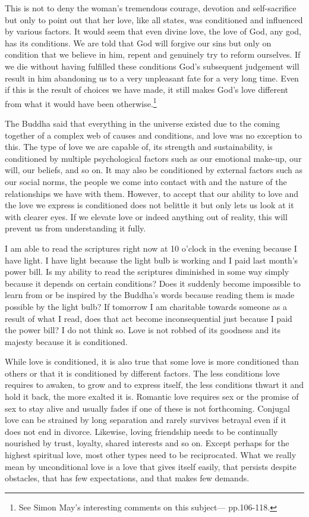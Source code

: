 \documentclass[10pt, openright]{book}
\begin{document}
This is not to deny the woman’s tremendous courage, devotion and self-sacrifice but only to point out that her love, like all states, was conditioned and influenced by various factors. It would seem that even divine love, the love of God, any god, has its conditions. We are told that God will forgive our sins but only on condition that we believe in him, repent and genuinely try to reform ourselves. If we die without having fulfilled these conditions God’s subsequent judgement will result in him abandoning us to a very unpleasant fate for a very long time. Even if this is the result of choices we have made, it still makes God’s love different from what it would have been otherwise.\footnote {See Simon May’s interesting comments on this subject—\cite{May 2012} pp.106-118.}


The Buddha said that everything in the universe existed due to the coming together of a complex web of causes and conditions, and love was no exception to this. The type of love we are capable of, its strength and sustainability, is conditioned by multiple psychological factors such as our emotional make-up, our will, our beliefs, and so on. It may also be conditioned by external factors such as our social norms, the people we come into contact with and the nature of the relationships we have with them. However, to accept that our ability to love and the love we express is conditioned does not belittle it but only lets us look at it with clearer eyes. If we elevate love or indeed anything out of reality, this will prevent us from understanding it fully.


I am able to read the scriptures right now at 10 o’clock in the evening because I have light. I have light because the light bulb is working and I paid last month’s power bill. Is my ability to read the scriptures diminished in some way simply because it depends on certain conditions? Does it suddenly become impossible to learn from or be inspired by the Buddha’s words because reading them is made possible by the light bulb? If tomorrow I am charitable towards someone as a result of what I read, does that act become inconsequential just because I paid the power bill? I do not think so. Love is not robbed of its goodness and its majesty because it is conditioned.


While love is conditioned, it is also true that some love is more conditioned than others or that it is conditioned by different factors. The less conditions love requires to awaken, to grow and to express itself, the less conditions thwart it and hold it back, the more exalted it is. Romantic love requires sex or the promise of sex to stay alive and usually fades if one of these is not forthcoming. Conjugal love can be strained by long separation and rarely survives betrayal even if it does not end in divorce. Likewise, loving friendship needs to be continually nourished by trust, loyalty, shared interests and so on. Except perhaps for the highest spiritual love, most other types need to be reciprocated. What we really mean by unconditional love is a love that gives itself easily, that persists despite obstacles, that has few expectations, and that makes few demands.
\end{document}
